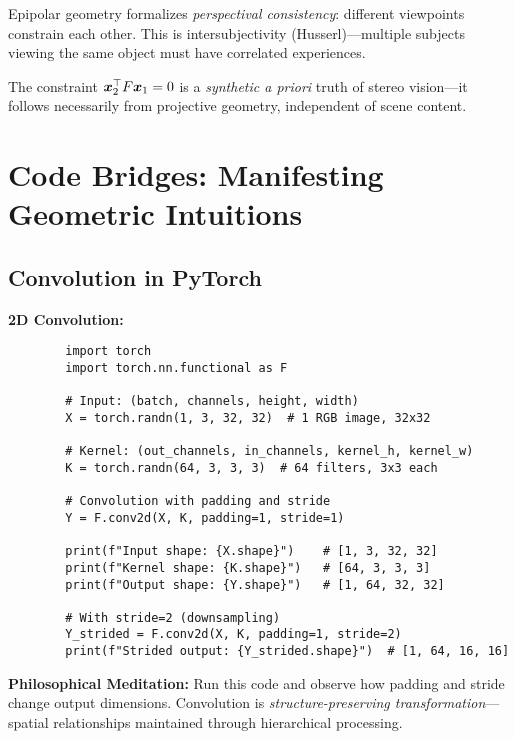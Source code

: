 \begin{philosophical}
	Epipolar geometry formalizes \textit{perspectival consistency}: different viewpoints constrain each other. This is intersubjectivity (Husserl)---multiple subjects viewing the same object must have correlated experiences.
	
	The constraint $\bm{x}_2^\top F \bm{x}_1 = 0$ is a \textit{synthetic a priori} truth of stereo vision---it follows necessarily from projective geometry, independent of scene content.
\end{philosophical}

\section{Code Bridges: Manifesting Geometric Intuitions}

\subsection{Convolution in PyTorch}

\begin{codebox}
	\textbf{2D Convolution:}
	
	\begin{lstlisting}
		import torch
		import torch.nn.functional as F
		
		# Input: (batch, channels, height, width)
		X = torch.randn(1, 3, 32, 32)  # 1 RGB image, 32x32
		
		# Kernel: (out_channels, in_channels, kernel_h, kernel_w)
		K = torch.randn(64, 3, 3, 3)  # 64 filters, 3x3 each
		
		# Convolution with padding and stride
		Y = F.conv2d(X, K, padding=1, stride=1)
		
		print(f"Input shape: {X.shape}")    # [1, 3, 32, 32]
		print(f"Kernel shape: {K.shape}")   # [64, 3, 3, 3]
		print(f"Output shape: {Y.shape}")   # [1, 64, 32, 32]
		
		# With stride=2 (downsampling)
		Y_strided = F.conv2d(X, K, padding=1, stride=2)
		print(f"Strided output: {Y_strided.shape}")  # [1, 64, 16, 16]
	\end{lstlisting}
	
	\textbf{Philosophical Meditation:} Run this code and observe how padding and stride change output dimensions. Convolution is \textit{structure-preserving transformation}---spatial relationships maintained through hierarchical processing.
\end{codebox}

